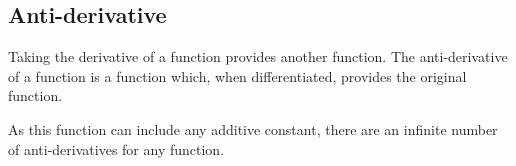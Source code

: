
\subsection{Anti-derivative}


Taking the derivative of a function provides another function. The anti-derivative of a function is a function which, when differentiated, provides the original function.

As this function can include any additive constant, there are an infinite number of anti-derivatives for any function.


